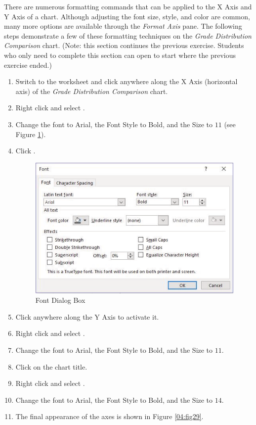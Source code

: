 There are numerous formatting commands that can be applied to the X Axis and Y Axis of a chart. Although adjusting the font size, style, and color are common, many more options are available through the \textit{Format Axis} pane. The following steps demonstrate a few of these formatting techniques on the \textit{Grade Distribution Comparison} chart. (Note: this section continues the previous exercise. Students who only need to complete this section can open  to start where the previous exercise ended.)

\begin{enumbox}
	\begin{enumerate}
		\item Switch to the  worksheet and click anywhere along the X Axis (horizontal axis) of the \textit{Grade Distribution Comparison} chart. 
		\item Right click and select .
		\item Change the font to Arial, the Font Style to Bold, and the Size to $ 11 $ (see Figure \ref{04:fig28}).
		\item Click .
	
		\begin{figure}[H]
			\centering
			\includegraphics[width=\maxwidth{.95\linewidth}]{gfx/ch04_fig28}
			\caption{Font Dialog Box}
			\label{04:fig28}
		\end{figure}
	
		\item Click anywhere along the Y Axis to activate it.
		\item Right click and select .
		\item Change the font to Arial, the Font Style to Bold, and the Size to $ 11 $.
		\item Click on the chart title.
		\item Right click and select .
		\item Change the font to Arial, the Font Style to Bold, and the Size to $ 14 $.
		\item The final appearance of the axes is shown in Figure \ref{04:fig29}.
	\end{enumerate}
\end{enumbox}
	
